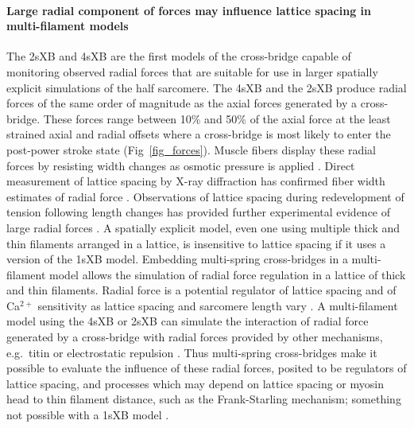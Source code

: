 \documentclass[10pt]{article}
\newcommand{\citep}[1]{\cite{#1}} %
\begin{document}
\paragraph{Large radial component of forces may influence lattice spacing in multi-filament models} %
The 2sXB and 4sXB are the first models of the cross-bridge capable of monitoring observed radial forces that are suitable for use in larger spatially explicit simulations of the half sarcomere. 
The 4sXB and the 2sXB produce radial forces of the same order of magnitude as the axial forces generated by a cross-bridge. 
These forces range between 10\% and 50\% of the axial force at the least strained axial and radial offsets where a cross-bridge is most likely to enter the post-power stroke state (Fig~\ref{fig_forces}).
Muscle fibers display these radial forces by resisting width changes as osmotic pressure is applied \citep{Maughan1981}.
Direct measurement of lattice spacing by X-ray diffraction has confirmed fiber width estimates of radial force \citep{Matsubara1984}.
Observations of lattice spacing during redevelopment of tension following length changes has provided further experimental evidence of large radial forces \citep{Cecchi1990}. %
A spatially explicit model, even one using multiple thick and thin filaments arranged in a lattice, is insensitive to lattice spacing if it uses a version of the 1sXB model.  
Embedding multi-spring cross-bridges in a multi-filament model allows the simulation of radial force regulation in a lattice of thick and thin filaments.  
Radial force is a potential regulator of lattice spacing and of Ca$^{2+}$ sensitivity as lattice spacing and sarcomere length vary \citep{Millman1998}.  
A multi-filament model using the 4sXB or 2sXB can simulate the interaction of radial force generated by a cross-bridge with radial forces provided by other mechanisms, e.g.\ titin or electrostatic repulsion \citep{Martyn2004, Cazorla2001, Millman1998}. 
Thus multi-spring cross-bridges make it possible to evaluate the influence of these radial forces, posited to be regulators of lattice spacing, and processes which may depend on lattice spacing or myosin head to thin filament distance, such as the Frank-Starling mechanism; something not possible with a 1sXB model \citep{Smith2009}. 
\end{document}
